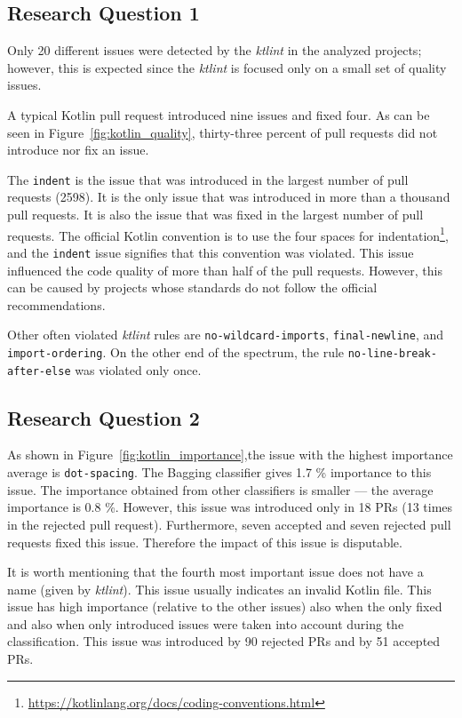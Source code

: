 \documentclass[digital,oneside,oldtable,nolof,nolot,nocover]{fithesis4}
\begin{document}
\subsection{Research Question 1}
\label{sec:orgde63d81}
Only 20 different issues were detected by the \emph{ktlint} in the analyzed projects;
however, this is expected since the \emph{ktlint} is focused only on a small set of quality issues.

A typical Kotlin pull request introduced nine issues and fixed four.
As can be seen in Figure~\ref{fig:kotlin_quality}, thirty-three percent
of pull requests did not introduce nor fix an issue.

The \texttt{indent} is the issue that was introduced in the largest number of pull requests (2598). It is the
only issue that was introduced in more than a thousand pull requests. It is also the issue
that was fixed in the largest number of pull requests. The official Kotlin convention is
to use the four spaces for indentation\footnote{\url{https://kotlinlang.org/docs/coding-conventions.html}},
and the \texttt{indent} issue signifies that this convention was violated. This issue influenced
the code quality of more than half of the pull requests. However, this can be caused by projects
whose standards do not follow the official recommendations.

Other often violated \emph{ktlint} rules are \texttt{no-wildcard-imports}, \texttt{final-newline}, and \texttt{import-ordering}.
On the other end of the spectrum, the rule \texttt{no-line-break-after-else} was violated only once.
\subsection{Research Question 2}
\label{sec:orgaf2de54}
As shown in Figure~\ref{fig:kotlin_importance},the issue with
the highest importance average is \texttt{dot-spacing}.
The Bagging classifier gives 1.7 \% importance to this issue. The importance obtained from other
classifiers is smaller --- the average importance is 0.8 \%.
However, this issue was introduced only in 18 PRs (13 times in the rejected pull request).
Furthermore, seven accepted and seven rejected pull requests fixed this issue.
Therefore the impact of this issue is disputable.

It is worth mentioning that the fourth most important issue does not have a name
(given by \emph{ktlint}).  This issue usually indicates an invalid Kotlin file.  This
issue has high importance (relative to the other issues) also when the only
fixed and also when only introduced issues were taken into account during the
classification. This issue was introduced by 90 rejected PRs and by 51
accepted PRs.
\end{document}
